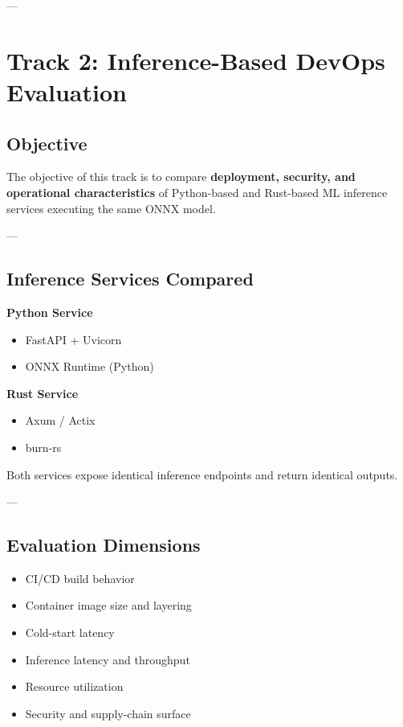 \documentclass[10pt,a4paper,twocolumn]{article}
\begin{document}
---

\section{Track 2: Inference-Based DevOps Evaluation}

\subsection{Objective}

The objective of this track is to compare \textbf{deployment, security, and operational characteristics} of Python-based and Rust-based ML inference services executing the same ONNX model.

---

\subsection{Inference Services Compared}

\textbf{Python Service}
\begin{itemize}
    \item FastAPI + Uvicorn
    \item ONNX Runtime (Python)
\end{itemize}

\textbf{Rust Service}
\begin{itemize}
    \item Axum / Actix
    \item burn-rs
\end{itemize}

Both services expose identical inference endpoints and return identical outputs.

---

\subsection{Evaluation Dimensions}

\begin{itemize}
    \item CI/CD build behavior
    \item Container image size and layering
    \item Cold-start latency
    \item Inference latency and throughput
    \item Resource utilization
    \item Security and supply-chain surface
\end{itemize}
\end{document}
